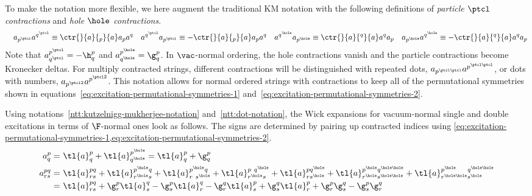 \begin{ntt}\label{ntt:dot-notation}
To make the notation more flexible, we here augment the traditional KM notation with the following definitions of \emph{particle $\ptcl$ contractions} and \emph{hole $\hole$ contractions}.%
\begin{align}
&&
  a_{p^\ptcl}a^{q^\ptcl}
\equiv
  \ctr{}{a}{_p}{a} a_pa^q
&&
  a^{q^\ptcl}a_{p^\ptcl}
\equiv
-
  \ctr{}{a}{_p}{a} a_pa^q
&&
  a^{q^\hole}a_{p^\hole}
\equiv
  \ctr{}{a}{^q}{a} a^qa_p
&&
  a_{p^\hole}a^{q^\hole}
\equiv
-
  \ctr{}{a}{^q}{a} a^qa_p
\end{align}
Note that $a^{p^\ptcl}_{q^\ptcl}=-\h^p_q$ and $a^{p^\hole}_{q^\hole}=\g_q^p$.
In $\vac$-normal ordering, the hole contractions vanish and the particle contractions become Kronecker deltas.
For multiply contracted strings, different contractions will be distinguished with repeated dots, $a_{p^{\ptcl\ptcl}}a^{p^{\ptcl\ptcl}}$, or dots with numbers, $a_{p^{\ptcl2}}a^{p^{\ptcl2}}$.
This notation allows for normal ordered strings with contractions to keep all of the permutational symmetries shown in equations~\ref{eq:excitation-permutational-symmetries-1} and~\ref{eq:excitation-permutational-symmetries-2}.
\end{ntt}

\begin{ex}\label{ex:km-notation-wick-expansions}
Using notations~\ref{ntt:kutzelnigg-mukherjee-notation} and~\ref{ntt:dot-notation}, the Wick expansions for vacuum-normal single and double excitations in terms of $\F$-normal ones look as follows.
The signs are determined by pairing up contracted indices using \cref{eq:excitation-permutational-symmetries-1,eq:excitation-permutational-symmetries-2}.
\begin{align*}
  a^p_q
=&\
  \tl{a}^p_q
+
  \tl{a}^{p^\hole}_{q^\hole}
=
  \tl{a}^p_q
+
  \g^p_q
\\
  a^{pq}_{rs}
=&\
  \tl{a}^{pq}_{rs}
+
  \tl{a}^{p^\hole q}_{r^\hole s}
+
  \tl{a}^{p^\hole q}_{r\ s^\hole}
+
  \tl{a}^{p\ q^\hole}_{r^\hole s}
+
  \tl{a}^{p q^\hole}_{r s^\hole}
+
  \tl{a}^{p^\hole q^{\hole\hole}}_{r^\hole s^{\hole\hole}}
+
  \tl{a}^{p^{\hole\hphantom{\hole}} q^{\hole\hole}}_{r^{\hole\hole} s^\hole}
\\=&\
  \tl{a}^{pq}_{rs}
+
  \g^p_r
  \tl{a}^{q}_{s}
-
  \g^p_s
  \tl{a}^{q}_{r}
-
  \g^q_r
  \tl{a}^{p}_{s}
+
  \g^q_s
  \tl{a}^{p}_{r}
+
  \g^p_r
  \g^q_s
-
  \g^p_s
  \g^q_r
\end{align*}
\end{ex}

